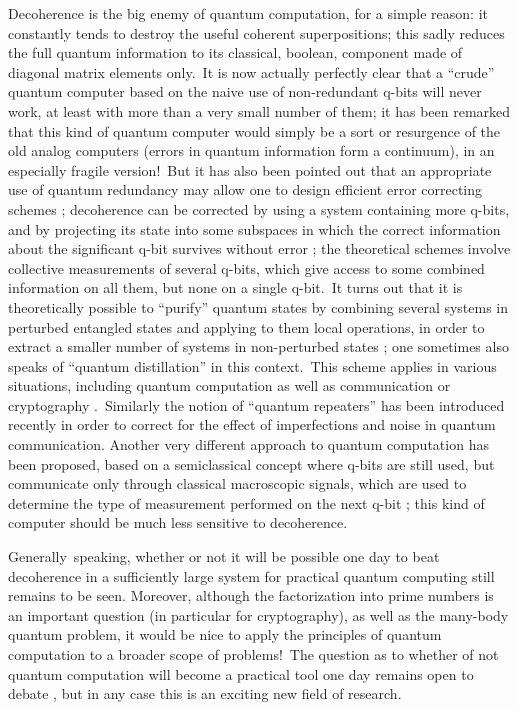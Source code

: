 \documentclass[12pt,onecolumn]{article}%
\begin{document}
Decoherence is the big enemy of quantum computation, for a simple reason: it
constantly tends to destroy the useful coherent superpositions; this sadly
reduces the full quantum information to its classical, boolean, component made
of diagonal matrix elements only.\ It is now actually perfectly clear that a
``crude'' quantum computer based on the naive use of non-redundant q-bits will
never work, at least with more than a very small number of them; it has been
remarked that this kind of quantum computer would simply be a sort or
resurgence of the old analog computers (errors in quantum information form a
continuum), in an especially fragile version!\ But it has also been pointed
out that an appropriate use of quantum redundancy may allow one to design
efficient error correcting schemes \cite{Shor2} \cite{Steane}; decoherence can
be corrected by using a system containing more q-bits, and by projecting its
state into some subspaces in which the correct information about the
significant q-bit survives without error \cite{Preskill}; the theoretical
schemes involve collective measurements of several q-bits, which give access
to some combined information on all them, but none on a single q-bit.\ It
turns out that it is theoretically possible to ``purify'' quantum states by
combining several systems in perturbed entangled states and applying to them
local operations, in order to extract a smaller number of systems in
non-perturbed states \cite{Benn}; one sometimes also speaks of ``quantum
distillation'' in this context.\ This scheme applies in various situations,
including quantum computation as well as communication or cryptography
\cite{Benn-PRA}.\ Similarly the notion of ``quantum repeaters'' \cite{Briegel}
has been introduced recently in order to correct for the effect of
imperfections and noise in quantum communication. Another very different
approach to quantum computation has been proposed, based on a semiclassical
concept where q-bits are still used, but communicate only through classical
macroscopic signals, which are used to determine the type of measurement
performed on the next q-bit \cite{Griffiths-comput}; this kind of computer
should be much less sensitive to decoherence.

Generally\ speaking, whether or not it will be possible one day to beat
decoherence in a sufficiently large system for practical quantum computing
still remains to be seen. Moreover, although the factorization into prime
numbers is an important question (in particular for cryptography), as well as
the many-body quantum problem, it would be nice to apply the principles of
quantum computation to a broader scope of problems!\ The question as to
whether of not quantum computation will become a practical tool one day
remains open to debate \cite{JMR} \cite{les2}, but in any case this is an
exciting new field of research.
\end{document}
